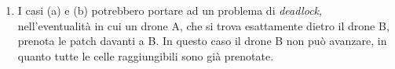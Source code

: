 \begin{enumerate} [label=(\alph*)]
\begin{figure}[H]
\begin{center}
        \end{center}
        \caption[short]{Caso di sovrapposizione dello scheduling delle patch.}
        \label{overlapping_b}
    \end{figure}
    \item I casi (a) e (b) potrebbero portare ad un problema di \textit{deadlock}, nell'eventualità in cui un drone A, che si trova esattamente dietro il drone B, prenota le patch davanti a B.
    In questo caso il drone B non può avanzare, in quanto tutte le celle raggiungibili sono già prenotate.
    \begin{figure}[H] 
        \captionsetup{justification=centering, margin=2cm, font=footnotesize}
        \begin{center}

\end{center}
\end{figure}
\end{enumerate}
